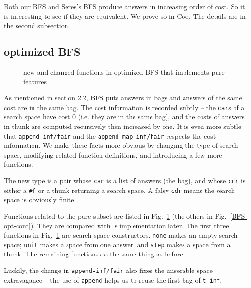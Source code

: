 \documentclass[format=acmlarge, review=true, authordraft=true]{acmart}
\begin{document}
Both our BFS and Seres's BFS \citet{seres1999algebra} produce answers in 
increasing order of cost. So it is interesting to see if they are equivalent. 
We prove so in Coq. The details are in the second subsection.

\subsection{optimized BFS}

\begin{figure}
		
	\caption{new and changed functions in optimized BFS that implements pure 
	features}
	\label{BFS-opt}
\end{figure}


As mentioned in section 2.2, BFS puts answers in bags and answers of the 
same cost are in the same bag. The cost
information is recorded subtly -- the \texttt{car}s of a search space have cost 
0 (i.e. they are in the same bag), and the costs of answers in thunk are 
computed recursively then increased by one. It is even more subtle that
\texttt{append-inf/fair} and the \texttt{append-map-inf/fair} respects the cost 
information. We make these facts more obvious by changing the type of search 
space, modifying related function definitions, and introducing a few more 
functions.

The new type is a pair whose \texttt{car} is a list of answers (the bag), and 
whose \texttt{cdr} is either a \texttt{\#{}f} or a thunk returning a search 
space. A falsy \texttt{cdr} means the search space is obviously finite. 

Functions related to the pure subset are listed in Fig.~\ref{BFS-opt} (the 
others in Fig.~\ref{BFS-opt-cont}). They are compared with 
\citeauthor{seres1999algebra}'s implementation later. The first three functions 
in Fig.~\ref{BFS-opt} are search space constructors. \texttt{none} makes an 
empty search space; \texttt{unit} makes a space from one answer; and 
\texttt{step} makes a space from a thunk. The remaining functions do the same 
thing as before. 

Luckily, the change in \texttt{append-inf/fair} also fixes the miserable space 
extravagance -- the use of \texttt{append} helps us to reuse the first bag of 
\texttt{t-inf}.
\end{document}
